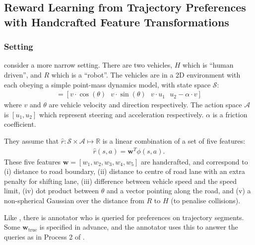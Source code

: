 \documentclass[11pt, a4paper, bibliography=totoc]{report}
\newcommand{\reals}{\mathbb{R}}
\newcommand{\rp}{\hat{r}}
\newcommand{\w}{\mathbf{w}}
\begin{document}
\subsection{Reward Learning from Trajectory Preferences with Handcrafted Feature Transformations}
\subsubsection{Setting}
\cite{Byk2017} consider a more narrow setting. There are two vehicles, $ H $ which is ``human driven'', and $ R $ which is a ``robot''. The vehicles are in a 2D environment with each obeying a simple point-mass dynamics model, with state space $ \mathcal{S} $:
\begin{align*}
[ \dot{x}~~~ \dot{y}~~~ \dot{\theta} ~~~ \dot{v} ] = [  v \cdot \cos(\theta) ~~~ v \cdot \sin(\theta) ~~~ v \cdot u_1 ~~~ u_2 - \alpha\cdot v  ] 
\end{align*}
where $ v $ and $ \theta $ are vehicle velocity and direction respectively. The action space $ \mathcal{A} $ is $ [u_1, u_2] $ which represent steering and acceleration respectively. $ \alpha $ is a friction coefficient.

They assume that $ \hat{r} : \mathcal{S} \times \mathcal{A} \mapsto \reals $ is a linear combination of a set of five features:
\begin{align*}
\rp(s,a) = \w^T \phi(s,a).
\end{align*}
These five features $ \w = [w_1, w_2, w_3, w_4, w_5] $ are handcrafted, and correspond to (i) distance to road boundary, (ii) distance to centre of road lane with an extra penalty for shifting lane, (iii) difference between vehicle speed and the speed limit, (iv) dot product between $ \theta $ and a vector pointing along the road, and (v) a non-spherical Gaussian over the distance from $ R $ to $ H $ (to penalise collisions).

Like \cite{Christiano2017}, there is annotator who is queried for preferences on trajectory segments. Some $ \w_\text{true} $ is specified in advance, and the annotator uses this to answer the queries as in Process 2 of \cite{Christiano2017}.
\end{document}
